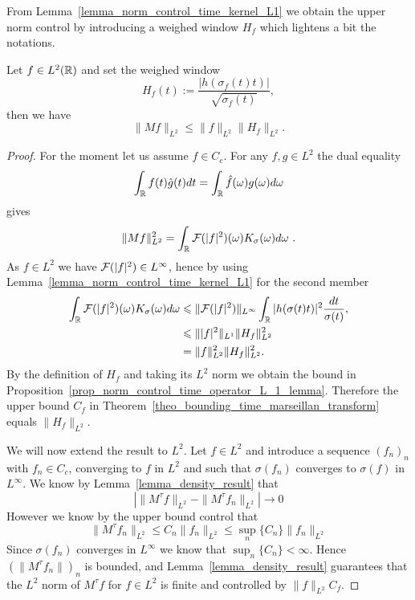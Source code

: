 From Lemma~\ref{lemma_norm_control_time_kernel_L1} we obtain the upper norm control by introducing a weighed window $H_f$ which lightens a bit the notations.
\begin{prop}\label{prop_norm_control_time_operator_L_1_lemma}
	Let $f\in L^2(\mathbb{R})$ and set the weighed window
	\begin{equation}
		H_f(t) := \frac{|h(\sigma_f(t)t)|}{\sqrt{\sigma_f(t)}},
	\end{equation}
	then we have
	\begin{equation}
		\|Mf\|_{L^2} \leqslant \|f\|_{L^2}\|H_f\|_{L^2}.
	\end{equation}
\end{prop}
\begin{proof}For the moment let us assume $f\in C_c$. For any $f,g\in L^2$ the dual equality
	\begin{equation*}
		\int_{\mathbb{R}} f(t)\hat{g}(t)dt = \int_{\mathbb{R}} \hat{f}(\omega)g(\omega)d\omega
	\end{equation*}
	gives
	\begin{equation*}
		\|Mf\|_{L^2}^2 = \int_{\mathbb{R}} \mathcal{F}(|f|^2)(\omega)K_\sigma(\omega)d\omega\ .
	\end{equation*}
	As $f\in L^2$ we have $\mathcal{F}(|f|^2)\in L^\infty$, hence by using Lemma~\ref{lemma_norm_control_time_kernel_L1} for the second member
	\begin{align*}
		\int_{\mathbb{R}} \mathcal{F}(|f|^2)(\omega)K_\sigma(\omega)d\omega & \leqslant \| \mathcal{F}(|f|^2)\|_{L^\infty}\int_{\mathbb{R}} |h(\sigma(t)t)|^2\frac{dt}{\sigma(t)}, \\
		& \leqslant \| |f|^2 \|_{L^1} \| H_f\|_{L^2}^2 \\
		& = \|f\|_{L^2}^2 \|H_f \|_{L^2}^2.				
	\end{align*}
	By the definition of $H_f$ and taking its $L^2$ norm we obtain the bound in Proposition~\ref{prop_norm_control_time_operator_L_1_lemma}. Therefore the upper bound $C_f$ in Theorem~\ref{theo_bounding_time_marseillan_transform} equals $\|H_f\|_{L^2}$.

 We will now extend the result to $L^2$. Let $f\in L^2$ and introduce a sequence $(f_n)_n$ with $f_n\in C_c$, converging to $f$ in $L^2$ and such that $\sigma(f_n)$ converges to $\sigma(f)$ in $L^\infty$. We know by Lemma~\ref{lemma_density_result} that 
 \begin{equation}
     \left|\|M^\tau f\|_{L^2} - \|M^\tau f_n \|_{L^2} \right| \rightarrow 0
 \end{equation}
 However we know by the upper bound control that
 \begin{equation}
     \|M^\tau f_n\|_{L^2} \leqslant C_n\|f_n\|_{L^2} \leqslant \sup_n \{C_n\}\|f_n\|_{L^2}
 \end{equation}
 Since $\sigma(f_n)$ converges in $L^\infty$ we know that $\sup_n \{C_n\}< \infty$. Hence $(\|M^\tau f_n\|)_n$ is bounded, and Lemma~\ref{lemma_density_result} guarantees that the $L^2$ norm of $M^\tau f$ for $f\in L^2$ is finite and controlled by $\|f\|_{L^2}C_f$.
 
\end{proof}

